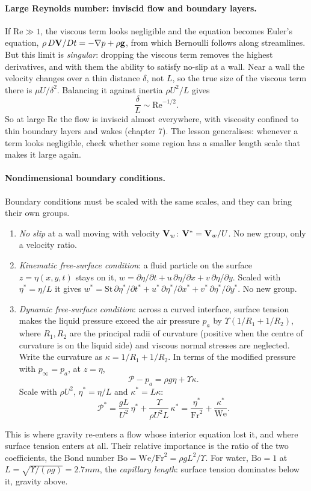 \paragraph{Large Reynolds number: inviscid flow and boundary layers.} If $\mathrm{Re} \gg 1$, the viscous term looks negligible and the equation becomes Euler's equation, $\rho\,D\mathbf{V}/Dt = -\nabla p + \rho\mathbf{g}$, from which Bernoulli follows along streamlines. But this limit is \emph{singular}: dropping the viscous term removes the highest derivatives, and with them the ability to satisfy no-slip at a wall. Near a wall the velocity changes over a thin distance $\delta$, not $L$, so the true size of the viscous term there is $\mu U/\delta^2$. Balancing it against inertia $\rho U^2/L$ gives
\[
\frac{\delta}{L} \sim \mathrm{Re}^{-1/2} .
\]
So at large $\mathrm{Re}$ the flow is inviscid almost everywhere, with viscosity confined to thin boundary layers and wakes (chapter 7). The lesson generalises: whenever a term looks negligible, check whether some region has a smaller length scale that makes it large again.

\paragraph{Nondimensional boundary conditions.} Boundary conditions must be scaled with the same scales, and they can bring their own groups.
\begin{enumerate}[nosep,leftmargin=*]
\item \emph{No slip} at a wall moving with velocity $\mathbf{V}_w$: $\mathbf{V}^* = \mathbf{V}_w/U$. No new group, only a velocity ratio.
\item \emph{Kinematic free-surface condition}: a fluid particle on the surface $z = \eta(x, y, t)$ stays on it, $w = \partial\eta/\partial t + u\,\partial\eta/\partial x + v\,\partial\eta/\partial y$. Scaled with $\eta^* = \eta/L$ it gives $w^* = \mathrm{St}\,\partial\eta^*/\partial t^* + u^*\,\partial\eta^*/\partial x^* + v^*\,\partial\eta^*/\partial y^*$. No new group.
\item \emph{Dynamic free-surface condition}: across a curved interface, surface tension makes the liquid pressure exceed the air pressure $p_a$ by $\Upsilon(1/R_1 + 1/R_2)$, where $R_1, R_2$ are the principal radii of curvature (positive when the centre of curvature is on the liquid side) and viscous normal stresses are neglected. Write the curvature as $\kappa = 1/R_1 + 1/R_2$. In terms of the modified pressure with $p_\infty = p_a$, at $z = \eta$,
\[
\mathcal{P} - p_a = \rho g \eta + \Upsilon\kappa .
\]
Scale with $\rho U^2$, $\eta^* = \eta/L$ and $\kappa^* = L\kappa$:
\[
\mathcal{P}^* = \frac{gL}{U^2}\,\eta^* + \frac{\Upsilon}{\rho U^2 L}\,\kappa^* = \frac{\eta^*}{\mathrm{Fr}^2} + \frac{\kappa^*}{\mathrm{We}} .
\]
\end{enumerate}
This is where gravity re-enters a flow whose interior equation lost it, and where surface tension enters at all. Their relative importance is the ratio of the two coefficients, the Bond number $\mathrm{Bo} = \mathrm{We}/\mathrm{Fr}^2 = \rho g L^2/\Upsilon$. For water, $\mathrm{Bo} = 1$ at $L = \sqrt{\Upsilon/(\rho g)} = 2.7\unit{mm}$, the \emph{capillary length}: surface tension dominates below it, gravity above.

